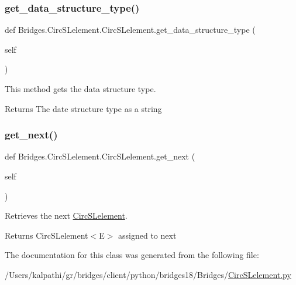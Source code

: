 \subsubsection{\texorpdfstring{get\+\_\+data\+\_\+structure\+\_\+type()}{get\_data\_structure\_type()}}
{\footnotesize\ttfamily def Bridges.\+Circ\+S\+Lelement.\+Circ\+S\+Lelement.\+get\+\_\+data\+\_\+structure\+\_\+type (\begin{DoxyParamCaption}\item[{}]{self }\end{DoxyParamCaption})}



This method gets the data structure type. 

\begin{DoxyReturn}{Returns}
The date structure type as a string 
\end{DoxyReturn}
\mbox{\label{class_bridges_1_1_circ_s_lelement_1_1_circ_s_lelement_a5d470152b0f73929a6add1606f8d8d9d}} 
\subsubsection{\texorpdfstring{get\+\_\+next()}{get\_next()}}
{\footnotesize\ttfamily def Bridges.\+Circ\+S\+Lelement.\+Circ\+S\+Lelement.\+get\+\_\+next (\begin{DoxyParamCaption}\item[{}]{self }\end{DoxyParamCaption})}



Retrieves the next \mbox{\hyperlink{class_bridges_1_1_circ_s_lelement_1_1_circ_s_lelement}{Circ\+S\+Lelement}}. 

\begin{DoxyReturn}{Returns}
Circ\+S\+Lelement$<$\+E$>$ assigned to next 
\end{DoxyReturn}


The documentation for this class was generated from the following file\+:\begin{DoxyCompactItemize}
\item 
/\+Users/kalpathi/gr/bridges/client/python/bridges18/\+Bridges/\mbox{\hyperlink{_circ_s_lelement_8py}{Circ\+S\+Lelement.\+py}}\end{DoxyCompactItemize}
